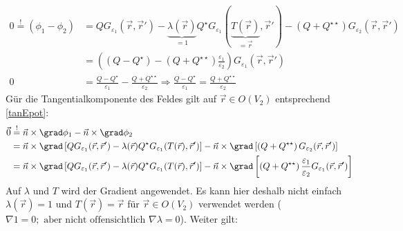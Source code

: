 		  	\begin{equation}\begin{split}
		  			0 \stackrel{!}{=}  (\phi_1 - \phi_2 ) & =   Q G_{\varepsilon_1}(\vec{r} , \vec{r}' ) - \underbrace{\lambda(\vec{r} )}_{=1} Q^\star G_{\varepsilon_1}(\underbrace{T(\vec{r} )}_{=\vec{r} }, \vec{r}' )
		  			-\left( Q +  Q^{\star\star}\right) G_{\varepsilon_2}(\vec{r} , \vec{r}' )\\
		  			& = \left( (Q-Q^\star) -(Q+Q^{\star\star})\frac{\varepsilon_1}{\varepsilon_2}   \right) G_{\varepsilon_1}(\vec{r} , \vec{r}' )\\
		  			0 &= \frac{Q-Q^\star}{\varepsilon_1} -\frac{Q+Q^{\star\star}}{\varepsilon_2} \Rightarrow \boxed{\frac{Q-Q^\star}{\varepsilon_1} = \frac{Q+Q^{\star\star}}{\varepsilon_2}}
		  	\end{split}\end{equation}
		  	 Gür die Tangentialkomponente des Feldes gilt auf $\vec{r} \in O(V_2)$ entsprechend \ref{tanEpot}:
		  	\begin{equation}\begin{split}
		  			\vec{0} & \stackrel{!}{=} \vec{n}\times \grad \phi_1 - \vec{n}\times \grad \phi_2 \\
		  			& = \vec{n}\times \grad \left[ Q G_{\varepsilon_1}(\vec{r} , \vec{r}' ) - \lambda(\vec{r} ) Q^\star G_{\varepsilon_1}(T(\vec{r} ), \vec{r}' ) \right]
		  			- \vec{n}\times \grad \left[ \left( Q +  Q^{\star\star}\right) G_{\varepsilon_2}(\vec{r} , \vec{r}' ) \right]\\
		  			& = \vec{n}\times \grad \left[ Q G_{\varepsilon_1}(\vec{r} , \vec{r}' ) - \lambda(\vec{r} ) Q^\star G_{\varepsilon_1}(T(\vec{r} ), \vec{r}' ) \right]
		  			- \vec{n}\times \grad \left[ \left( Q +  Q^{\star\star}\right) \frac{\varepsilon_1}{\varepsilon_2} G_{\varepsilon_1}(\vec{r} , \vec{r}' ) \right]
		  	\end{split}\end{equation}
		  	 Auf $\lambda$ und $T$ wird der Gradient angewendet. Es kann hier deshalb nicht einfach $\lambda(\vec{r} )=1$ und $T(\vec{r} )=\vec{r} $ für $\vec{r} \in O(V_2)$ verwendet werden ($\nabla 1=0; \text{ aber nicht offensichtlich }\nabla \lambda = 0$). Weiter gilt:
